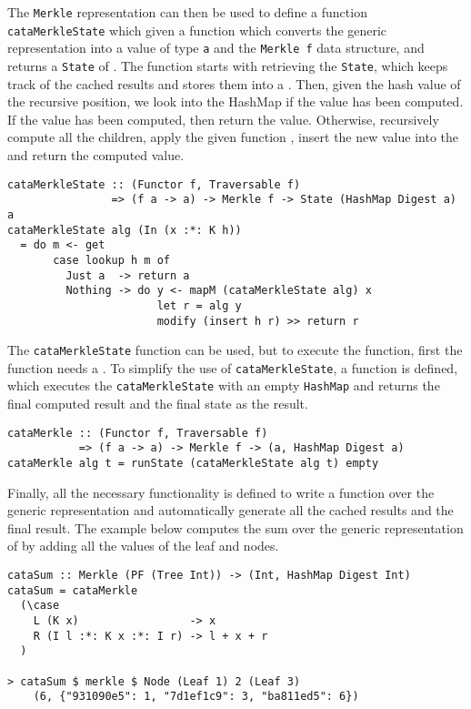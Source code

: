 \pagebreak
The \texttt{Merkle} representation can then be used to define a function \texttt{cataMerkleState} which given a function  which converts the generic representation  into a value of type \texttt{a} and the \texttt{Merkle f} data structure, and returns a \texttt{State} of . The  function starts with retrieving the \texttt{State}, which keeps track of the cached results and stores them into a . Then, given the hash value of the recursive position, we look into the HashMap if the value has been computed. If the value has been computed, then return the value. Otherwise, recursively compute all the children, apply the given function , insert the new value into the  and return the computed value.

\begin{verbatim}
cataMerkleState :: (Functor f, Traversable f)
                => (f a -> a) -> Merkle f -> State (HashMap Digest a) a
cataMerkleState alg (In (x :*: K h)) 
  = do m <- get
       case lookup h m of
         Just a  -> return a
         Nothing -> do y <- mapM (cataMerkleState alg) x
                       let r = alg y
                       modify (insert h r) >> return r
\end{verbatim}

The \texttt{cataMerkleState} function can be used, but to execute the function, first the function needs a . To simplify the use of \texttt{cataMerkleState}, a function  is defined, which executes the \texttt{cataMerkleState} with an empty \texttt{HashMap} and returns the final computed result and the final state as the result. 

\begin{verbatim}
cataMerkle :: (Functor f, Traversable f)
           => (f a -> a) -> Merkle f -> (a, HashMap Digest a)
cataMerkle alg t = runState (cataMerkleState alg t) empty
\end{verbatim}

Finally, all the necessary functionality is defined to write a function over the generic representation and automatically generate all the cached results and the final result. The example below computes the sum over the generic representation of  by adding all the values of the leaf and nodes. 

\begin{verbatim}
cataSum :: Merkle (PF (Tree Int)) -> (Int, HashMap Digest Int)
cataSum = cataMerkle
  (\case
    L (K x)                 -> x
    R (I l :*: K x :*: I r) -> l + x + r
  )

> cataSum $ merkle $ Node (Leaf 1) 2 (Leaf 3)
    (6, {"931090e5": 1, "7d1ef1c9": 3, "ba811ed5": 6})
\end{verbatim}